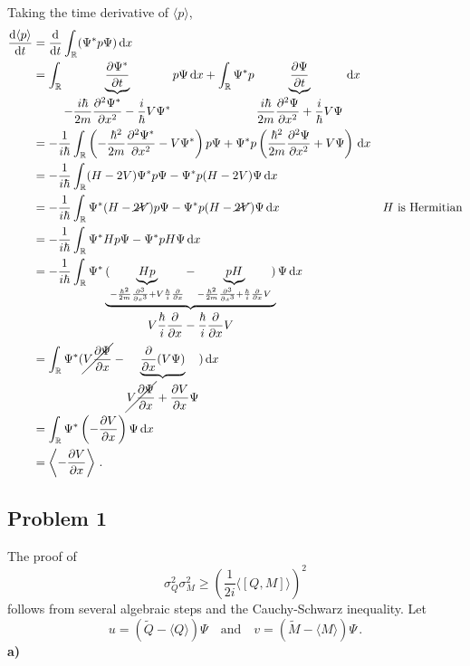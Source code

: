\documentclass[letterpaper,10pt]{article}
\def\expect#1{\langle #1\rangle}
\def\d{\mathrm{d}}
\begin{document}
Taking the time derivative of $\expect{p}$,
\begin{align*}
\frac{\d\expect{p}}{\d t}&=\frac{\d}{\d t}\int_\mathbb{R}(\Psi^*p\Psi)\,\d x\\
&=\int_\mathbb{R}\underbrace{\frac{\partial\Psi^*}{\partial t}}_
{\displaystyle
-\frac{i\hbar}{2m}\frac{\partial^2\Psi^*}{\partial x^2}-\frac{i}{\hbar}V\Psi^*}
p\Psi\,\d x
+\int_\mathbb{R}\Psi^*p\underbrace{\frac{\partial\Psi}{\partial t}}_
{\displaystyle
\frac{i\hbar}{2m}\frac{\partial^2\Psi}{\partial x^2}+\frac{i}{\hbar}V\Psi}
\,\d x\\
&=-\frac{1}{i\hbar}\int_\mathbb{R}
\left(-\frac{\hbar^2}{2m}\frac{\partial^2\Psi^*}{\partial
x^2}-V\Psi^*\right)p\Psi+\Psi^*p
\left(\frac{\hbar^2}{2m}\frac{\partial^2\Psi}{\partial x^2}+V\Psi
\right)\,\d x\\
&=-\frac{1}{i\hbar}\int_\mathbb{R}
(H-2V)\Psi^*p\Psi-\Psi^*p(H-2V)\Psi\,\d x\\
&=-\frac{1}{i\hbar}\int_\mathbb{R}
\Psi^*(H-\cancel{2V})p\Psi-\Psi^*p(H-\cancel{2V})\Psi\,\d x
& H \text{ is Hermitian} \\
&=-\frac{1}{i\hbar}\int_\mathbb{R}
\Psi^*Hp\Psi-\Psi^*pH\Psi\,\d x\\
&=-\frac{1}{i\hbar}\int_\mathbb{R} \Psi^*\underbrace{(\underbrace{Hp}_
{-\frac{\hbar^2}{2m}\frac{\partial^3}{\partial x^3}
+V\frac{\hbar}{i}\frac{\partial}{\partial x}}
-\underbrace{pH}_
{-\frac{\hbar^2}{2m}\frac{\partial^3}{\partial x^3}
+\frac{\hbar}{i}\frac{\partial}{\partial x}V}
)}_
{\displaystyle V\frac{\hbar}{i}\frac{\partial}{\partial x}
-\frac{\hbar}{i}\frac{\partial}{\partial x}V}
\Psi\,\d x\\
&=\int_\mathbb{R}\Psi^*(\cancel{
V\frac{\partial\Psi}{\partial x}}
-\underbrace{\frac{\partial}{\partial x}(V\Psi)}_
{\displaystyle \cancel{V\frac{\partial\Psi}{\partial x}}
+\frac{\partial V}{\partial x}\Psi}
)\,\d x \\
&=\int_\mathbb{R}\Psi^*\left(-\frac{\partial V}{\partial x}\right)\Psi\,\d x\\
&=\left\langle -\frac{\partial V}{\partial x}\right\rangle\,.
\end{align*}



\subsection*{Problem 1}
The proof of
\[
\sigma_Q^2\sigma_M^2\geq\left(\frac{1}{2i}\langle\left[Q,M\right]
\rangle\right)^2
\]
follows from several algebraic steps and the Cauchy-Schwarz inequality. Let
\[
u=(\tilde Q-\expect{Q})\Psi\quad\text{and}\quad v=(\tilde M-\expect{M})\Psi\,.
\]
\textbf{a)}
\end{document}
